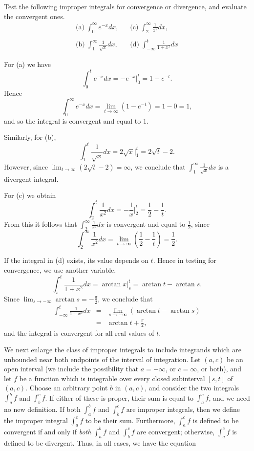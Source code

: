 \begin{example}
Test the following improper integrals for convergence or divergence, and evaluate the convergent ones.
$$
\begin{array}{ll}
\mbox{(a)}\; \int_0^\infty e^{-x} dx, \;\;\; &\mbox{(c)}\; \int_2^\infty \frac{1}{x^2} dx,\\
&\\
\mbox{(b)}\; \int_1^\infty \frac{1}{\sqrt x} dx, \;\;\; &\mbox{(d)}\; \int_{-\infty}^t \frac{1}{1+x^2} dx
\end{array}
$$

For (a) we have
$$
\int_0^t  e^{-x} dx = -e^{-x}\Big|_0^t  = 1- e^{-t} .
$$
\noindent Hence 
$$
\int_0^\infty  e^{-x} dx = \lim_{t \rightarrow \infty} (1 - e^{-t}) = 1 - 0 = 1,
$$
\noindent and so the integral is convergent and equal to 1.

Similarly, for (b),
$$
\int_1^t \frac{1}{\sqrt x} dx = 2 \sqrt x \Big|_1^t = 2 \sqrt t - 2.
$$
\noindent However, since $\lim_{t \rightarrow \infty} (2\sqrt t - 2) = \infty$, we conclude that $\int_1^{\infty} \frac{1}{\sqrt x} dx$ is a divergent integral.

For (c) we obtain
$$
\int_2^t \frac{1}{x^2} dx = - \frac{1}{x} \Big|_2^t = \frac{1}{2} - \frac{1}{t} .
$$
\noindent From this it follows that $\int_2^{\infty} \frac{1}{x^2} dx$ is convergent and equal to $\frac{1}{2}$, since 
$$
\int_2^{\infty} \frac{1}{x^2} dx = \lim_{t \rightarrow \infty} (\frac{1}{2} - \frac{1}{t}) = \frac{1}{2} .
$$


If the integral in (d) exists, its value depends on $t$. Hence in testing for convergence, we use another variable.
$$
\int_s^t \frac{1}{1 + x^2} dx = \arctan x \Big|_s^t = \arctan t - \arctan s.
$$
\noindent Since $\lim_{s \rightarrow -\infty} \arctan s = - \frac{\pi}{2}$, we conclude that 
\begin{eqnarray*}
\int_{-\infty}^t \frac{1}{1 + x^2} dx 
&=& \lim_{s \rightarrow -\infty} (\arctan t - \arctan s) \\
&=& \arctan t + \frac{\pi}{2} ,
\end{eqnarray*}
\noindent and the integral is convergent for all real values of $t$.
\end{example}

We next enlarge the class of improper integrals to include integrands which are unbounded near both endpoints of the interval of integration. Let $(a, c)$ be an open interval (we include the possibility that $a = -\infty$, or $c = \infty$, or both), and let $f$ be a function which is integrable over every closed subinterval $[s, t]$ of $(a, c)$. Choose an arbitrary point $b$ in $(a, c)$, and consider the two integrals $\int_a^b f$ and $\int_b^c f$. If either of these is proper, their sum is equal to  $\int_a^c f$, and we need no new definition. If both $\int_a^b f$ and $\int_b^c f$ are improper integrals, then we define the improper integral $\int_a^c f$ to be their sum. Furthermore, $\int_a^c f$ is defined to be convergent if and only if \textit{both} $\int_a^b f$ and $\int_b^c f$ are convergent; otherwise, $\int_a^c f$ is defined to be divergent. Thus, in all cases, we have the equation



